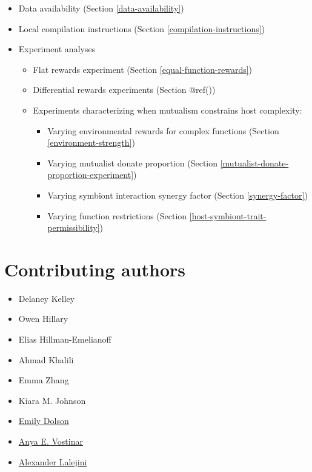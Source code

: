 \documentclass[
]{book}
\providecommand{\tightlist}{%
  \setlength{\itemsep}{0pt}\setlength{\parskip}{0pt}}
\begin{document}
\begin{itemize}
\tightlist
\item
  Data availability
  (Section \ref{data-availability})
\item
  Local compilation instructions
  (Section \ref{compilation-instructions})
\item
  Experiment analyses

  \begin{itemize}
  \tightlist
  \item
    Flat rewards experiment (Section \ref{equal-function-rewards})
  \item
    Differential rewards experiments (Section @ref())
  \item
    Experiments characterizing when mutualism constrains host complexity:

    \begin{itemize}
    \tightlist
    \item
      Varying environmental rewards for complex functions (Section \ref{environment-strength})
    \item
      Varying mutualist donate proportion (Section \ref{mutualist-donate-proportion-experiment})
    \item
      Varying symbiont interaction synergy factor (Section \ref{synergy-factor})
    \item
      Varying function restrictions (Section \ref{host-symbiont-trait-permissibility})
    \end{itemize}
  \end{itemize}
\end{itemize}

\hypertarget{contributing-authors}{%
\section{Contributing authors}\label{contributing-authors}}

\begin{itemize}
\tightlist
\item
  Delaney Kelley
\item
  Owen Hillary
\item
  Elias Hillman-Emelianoff
\item
  Ahmad Khalili
\item
  Emma Zhang
\item
  Kiara M. Johnson
\item
  \href{https://ecodelab.com/}{Emily Dolson}
\item
  \href{https://anyaevostinar.github.io/}{Anya E. Vostinar}
\item
  \href{https://lalejini.com}{Alexander Lalejini}
\end{itemize}
\end{document}
